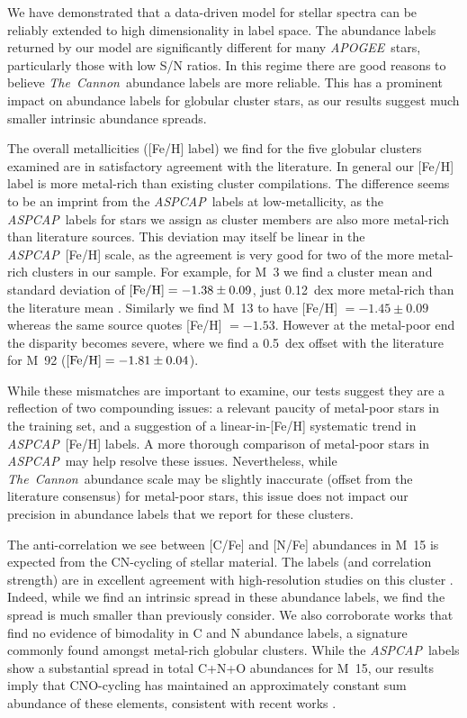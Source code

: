 \documentclass[12pt,preprint]{aastex}
\newcommand{\project}[1]{\textsl{#1}}
\newcommand{\TheCannon}{\project{The~Cannon}}
\newcommand{\acronym}[1]{{\small{#1}}}
\newcommand{\apogee}{\project{\acronym{APOGEE}}}
\newcommand{\aspcap}{\project{\acronym{ASPCAP}}}
\begin{document}
We have demonstrated that a data-driven model for stellar spectra can be
reliably extended to high dimensionality in label space.  The abundance
labels returned by our model are significantly different for many
\apogee\ stars, particularly those with low S/N ratios.  In this regime
there are good reasons to believe \TheCannon\ abundance labels are more
reliable.  This has a prominent impact on abundance labels for globular
cluster stars, as our results suggest much smaller intrinsic abundance
spreads.


The overall metallicities ([Fe/H] label) we find for the five globular
clusters examined are in satisfactory agreement with the literature.  In
general our [Fe/H] label is more metal-rich than existing cluster
compilations.  The difference seems to be an imprint from
the \aspcap\ labels at low-metallicity, as the \aspcap\ labels for 
stars we assign as cluster members are also more metal-rich than
literature sources. This deviation may itself be linear in the 
\aspcap\ [Fe/H] scale, as the agreement is very good for two of the
more metal-rich clusters in our sample.  For example, for M~3 we find a cluster mean and standard
deviation of $[{\rm Fe/H}] = -1.38 \pm 0.09$, just 0.12~dex more metal-rich
than the literature mean \citep{Harris}.  Similarly we find M~13 to have
[Fe/H] $= -1.45 \pm 0.09$ whereas the same source quotes [Fe/H] $= -1.53$.
However at the metal-poor end the disparity becomes severe, where we find
a 0.5~dex offset with the literature for M~92 ($[{\rm Fe/H}] = -1.81 \pm 0.04$).


While these mismatches are important to examine, our tests suggest they
are a reflection of two compounding issues: a relevant paucity of metal-poor
stars in the training set, and a suggestion of a linear-in-[Fe/H] systematic
trend in \aspcap\ [Fe/H] labels.  A more thorough comparison of metal-poor
stars in \aspcap\ may help resolve these issues.  Nevertheless, while
\TheCannon\ abundance scale may be slightly inaccurate (offset from the
literature consensus) for metal-poor stars, this issue does not impact
our precision in abundance labels that we report for these clusters.  



The anti-correlation we see between [C/Fe] and [N/Fe] abundances in M~15 is
expected from the CN-cycling of stellar material.  The labels (and correlation
strength) are in excellent agreement with high-resolution studies on this cluster
\citep{Cohen_2005}.  Indeed, while we find an intrinsic spread in these abundance
labels, we find the spread is much smaller than previously consider.  We also
corroborate works that find no evidence of bimodality in C and N 
abundance labels, a signature commonly found amongst metal-rich globular clusters.
While the \aspcap\ labels show a substantial spread in total C+N+O abundances
for M~15, our results imply that CNO-cycling has maintained an approximately
constant sum abundance of these elements, consistent with recent works
\citep{Meszaros_2015}.
\end{document}
